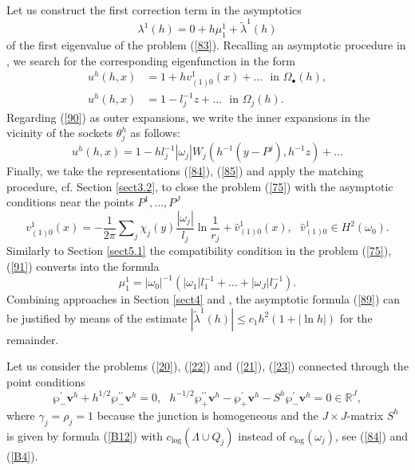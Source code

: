 \documentclass[11pt]{article}%
\numberwithin{equation}{section}
\begin{document}
Let us construct the first correction term in the asymptotics%
\begin{equation}
\lambda^{1}(h)=0+h\mu_{1}^{1}+\widetilde{\lambda}^{1}(h) \label{89}%
\end{equation}
of the first eigenvalue of the problem (\ref{83}). Recalling an asymptotic
procedure in \cite[Section 2]{BuCaNa1}, we search for the corresponding
eigenfunction in the form%
\begin{align}
u^{h}(h,x)  &  =1+hv_{(1)0}^{1}(x)+...\ \ \ \text{in }\Omega_{\bullet
}(h),\label{90}\\
u^{h}(h,x)  &  =1-l_{j}^{-1}z+...\ \ \ \text{in }\Omega_{j}(h).\nonumber
\end{align}
Regarding (\ref{90}) as outer expansions, we write the inner expansions in the
vicinity of the sockets $\theta_{j}^{h}$ as follows:%
\[
u^{h}(h,x)=1-hl_{j}^{-1}|\omega_{j}|W_{j}(h^{-1}(y-P^{j}),h^{-1}z)+...
\]
Finally, we take the representations (\ref{84}), (\ref{85}) and apply the
matching procedure, cf. Section \ref{sect3.2}, to close the problem (\ref{75})
with the asymptotic conditions near the points $P^{1},...,P^{J}$%
\begin{equation}
v_{(1)0}^{1}(x)=-\frac{1}{2\pi}\sum\nolimits_{j}\chi_{j}(y)\frac{|\omega_{j}%
|}{l_{j}}\ln\frac{1}{r_{j}}+\widehat{v}_{(1)0}^{1}(x),\ \ \ \widehat{v}%
_{(1)0}^{1}\in H^{2}(\omega_{0}). \label{91}%
\end{equation}
Similarly to Section \ref{sect5.1} the compatibility condition in the problem
(\ref{75}), (\ref{91}) converts into the formula%
\[
\mu_{1}^{1}=|\omega_{0}|^{-1}(|\omega_{1}|l_{1}^{-1}+...+|\omega_{J}%
|l_{J}^{-1}).
\]
Combining approaches in Section \ref{sect4} and \cite[Sect. 2]{BuCaNa1}, the
asymptotic formula (\ref{89}) can be justified by means of the estimate
$|\widetilde{\lambda}^{1}(h)|\leq c_{1}h^{2}(1+|\ln h|)$ for the remainder.

Let us consider the problems (\ref{20}), (\ref{22}) and (\ref{21}), (\ref{23})
connected through the point conditions%
\begin{equation}
\wp_{-}^{\prime}\mathbf{v}^{h}+h^{1/2}\wp_{-}^{\prime\prime}\mathbf{v}%
^{h}=0,\ \ \ h^{-1/2}\wp_{+}^{\prime\prime}\mathbf{v}^{h}-\wp_{+}^{\prime
}\mathbf{v}^{h}-S^{h}\wp_{-}^{\prime}\mathbf{v}^{h}=0\in\mathbb{R}^{J},
\label{93}%
\end{equation}
where $\gamma_{j}=\rho_{j}=1$ because the junction is homogeneous and the
$J\times J$-matrix $S^{h}$ is given by formula (\ref{B12}) with $c_{\log
}(\Lambda\cup Q_{j})$ instead of $c_{\log}(\omega_{j})$, see (\ref{84}) and
(\ref{B4}).
\end{document}
